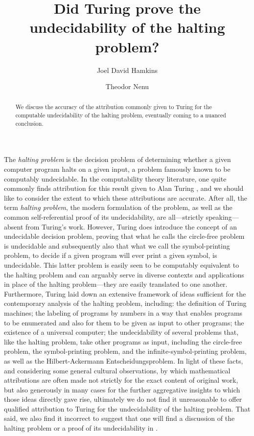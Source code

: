 \documentclass[12pt]{amsart}
\title{Did Turing prove the undecidability of the halting problem?}
\author[Hamkins]{Joel David Hamkins}
\author[Nenu]{Theodor Nenu}
\begin{document}
\begin{abstract}

We discuss the accuracy of the attribution commonly given to Turing \cite{Turing1936:On-computable-numbers} for the computable undecidability of the halting problem, eventually coming to a nuanced conclusion.

\end{abstract}
\maketitle

{
\small
\tableofcontents
}

\newpage
The \emph{halting problem} is the decision problem of determining whether a given computer program halts on a given input, a problem famously known to be computably undecidable. In the computability theory literature, one quite commonly finds attribution for this result given to Alan Turing \cite{Turing1936:On-computable-numbers}, and we should like to consider the extent to which these attributions are accurate. After all, the term \emph{halting problem}, the modern formulation of the problem, as well as the common self-referential proof of its undecidability, are all---strictly speaking---absent from Turing's work. However, Turing does introduce the concept of an undecidable decision problem, proving that what he calls the circle-free problem is undecidable and subsequently also that what we call the symbol-printing problem, to decide if a given program will ever print a given symbol, is undecidable. This latter problem is easily seen to be computably equivalent to the halting problem and can arguably serve in diverse contexts and applications in place of the halting problem---they are easily translated to one another. Furthermore, Turing laid down an extensive framework of ideas sufficient for the contemporary analysis of the halting problem, including: the definition of Turing machines; the labeling of programs by numbers in a way that enables programs to be enumerated and also for them to be given as input to other programs; the existence of a universal computer; the undecidability of several problems that, like the halting problem, take other programs as input, including the circle-free problem, the symbol-printing problem, and the infinite-symbol-printing problem, as well as the Hilbert-Ackermann Entscheidungsproblem. In light of these facts, and considering some general cultural observations, by which mathematical attributions are often made not strictly for the exact content of original work, but also generously in many cases for the further aggregative insights to which those ideas directly gave rise, ultimately we do not find it unreasonable to offer qualified attribution to Turing for the undecidability of the halting problem. That said, we also find it incorrect to suggest that one will find a discussion of the halting problem or a proof of its undecidability in \cite{Turing1936:On-computable-numbers}.\goodbreak
\end{document}

